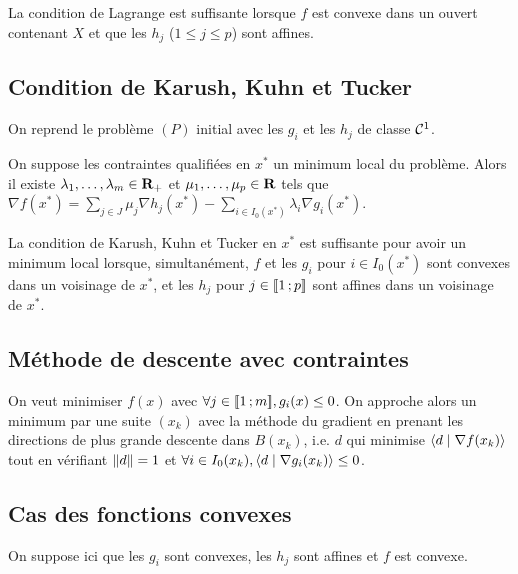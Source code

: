 	\begin{thm}
		La condition de Lagrange est suffisante lorsque $f$ est convexe dans un ouvert contenant $X$ et que les $h_j$ ($1 \leq j \leq p$) sont affines.
	\end{thm}

\subsection{Condition de Karush, Kuhn et Tucker}

	On reprend le problème $(P)$ initial avec les $g_i$ et les $h_j$ de classe $\mathcal{C}^1$.

	\begin{thm}
		On suppose les contraintes qualifiées en $x^*$ un minimum local du problème.
		Alors il existe $\lambda_1,\ldots,\lambda_m \in \mathbf{R}_+$ et $\mu_1,\ldots,\mu_p \in \mathbf{R}$ tels que $\nabla f(x^*) = \sum_{j \in J} \mu_j \nabla h_j(x^*) - \sum_{i \in I_0(x^*)} \lambda_i \nabla g_i(x^*)$.
	\end{thm}

	\begin{thm}
        La condition de Karush, Kuhn et Tucker en $x^*$ est suffisante pour avoir un minimum local lorsque, simultanément, $f$ et les $g_i$ pour $i \in I_0(x^*)$ sont convexes dans un voisinage de $x^*$,  et les $h_j$ pour $j \in \mathopen{[\![}1\mathclose{}\mathpunct{};p\mathclose{]\!]}$ sont affines dans un voisinage de $x^*$.
	\end{thm}

\subsection{Méthode de descente avec contraintes}

    On veut minimiser $f(x)$ avec $\forall j \in \mathopen{[\![}1\mathclose{}\mathpunct{};m\mathclose{]\!]}, g_i(x) \leq 0$.
    On approche alors un minimum par une suite $(x_k)$ avec la méthode du gradient en prenant les directions de plus grande descente dans $B(x_k)$, i.e. $d$ qui minimise $\left\langle d \mid \nabla f(x_k) \right\rangle$ tout en vérifiant $\left\lVert d\right\rVert = 1$ et $\forall i \in I_0(x_k), \left\langle d \mid \nabla g_i(x_k) \right\rangle \leq 0$.


\subsection{Cas des fonctions convexes}

    On suppose ici que les $g_i$ sont convexes, les $h_j$ sont affines et $f$ est convexe.

